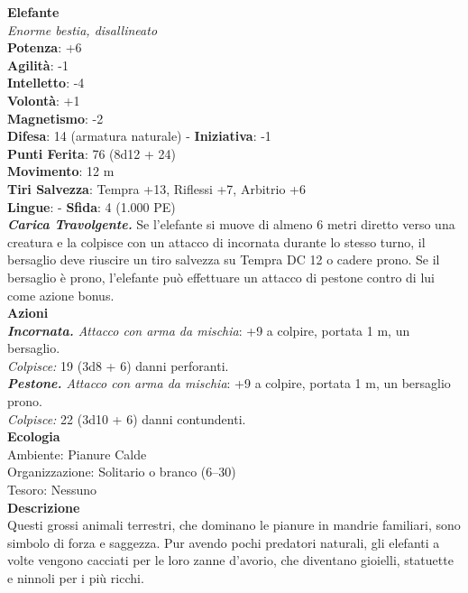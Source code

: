 \begin{multicols}{2}
\medskip\textbf{Elefante}\\
\emph{Enorme bestia, disallineato}\\
\textbf{Potenza}: +6\\
\textbf{Agilità}: -1\\
\textbf{Intelletto}: -4\\
\textbf{Volontà}: +1\\
\textbf{Magnetismo}: -2\\
\textbf{Difesa}: 14 (armatura naturale) - \textbf{Iniziativa}: -1\\
\textbf{Punti Ferita}: 76 (8d12 + 24)\\
\textbf{Movimento}: 12 m\\
\textbf{Tiri Salvezza}: Tempra +13, Riflessi +7, Arbitrio +6 \\
\textbf{Lingue}: -
\textbf{Sfida}: 4 (1.000 PE)\smallskip\\
\emph{\textbf{Carica Travolgente.}} Se l'elefante si muove di almeno 6 metri diretto verso una creatura e la colpisce con un attacco di incornata durante lo stesso turno, il bersaglio deve riuscire un tiro salvezza su Tempra DC 12 o cadere prono. Se il bersaglio è prono, l'elefante può effettuare un attacco di pestone contro di lui come azione bonus.\\
\smallskip\textbf{Azioni}\\
\emph{\textbf{Incornata.} Attacco con arma da mischia}: +9 a colpire, portata 1 m, un bersaglio.\\
\emph{Colpisce:} 19 (3d8 + 6) danni perforanti.\\
\emph{\textbf{Pestone.} Attacco con arma da mischia}: +9 a colpire, portata 1 m, un bersaglio prono.\\
\emph{Colpisce:} 22 (3d10 + 6) danni contundenti.\\
\textbf{Ecologia}\\
Ambiente: Pianure Calde\\
Organizzazione: Solitario o branco (6–30)\\
Tesoro: Nessuno\\
\textbf{Descrizione}\\

Questi grossi animali terrestri, che dominano le pianure in mandrie familiari, sono simbolo di forza e saggezza. Pur avendo pochi predatori naturali, gli elefanti a volte vengono cacciati per le loro zanne d’avorio, che diventano gioielli, statuette e ninnoli per i più ricchi. \\


\end{multicols}
